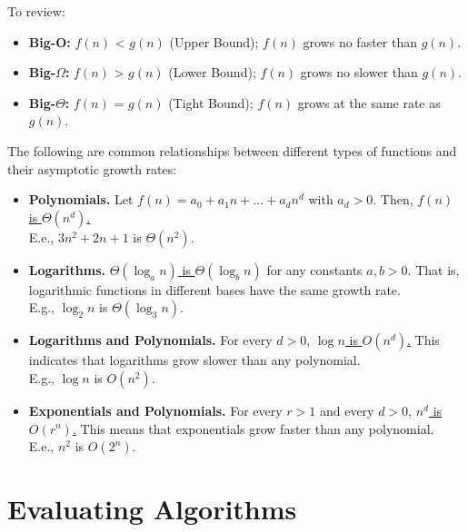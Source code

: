 \begin{Tip}
    To review:
    \begin{itemize}
        \item \textbf{Big-O:} $f(n)$ < $g(n)$ (Upper Bound); $f(n)$ grows no faster than $g(n)$.
        \item \textbf{Big-$\Omega$:} $f(n)$ > $g(n)$ (Lower Bound); $f(n)$ grows no slower than $g(n)$.
        \item \textbf{Big-$\Theta$:} $f(n)$ = $g(n)$ (Tight Bound); $f(n)$ grows at the same rate as $g(n)$.
    \end{itemize}
\end{Tip}

\begin{theo}

    The following are common relationships between different types of functions and their asymptotic growth rates:

    \begin{itemize}
        \item \textbf{Polynomials.} Let $f(n) = a_0 + a_1 n + \dots + a_d n^d$ with $a_d > 0$. Then, \underline{$f(n)$ is $\Theta(n^d)$.}\\
        E.e., $3n^2+2n+1$ is $\Theta(n^2)$.
        
        \item \textbf{Logarithms.} \underline{$\Theta(\log_a n)$ is $\Theta(\log_b n)$} for any constants $a, b > 0$. That is, logarithmic functions in different bases have the same growth rate.\\
        E.g., $\log_2 n$ is $\Theta(\log_3 n)$.
        
        \item \textbf{Logarithms and Polynomials.} For every $d > 0$, \underline{$\log n$ is $O(n^d)$.} This indicates that logarithms grow slower than any polynomial.\\
        E.g., $\log n$ is $O(n^2)$.
        
        \item \textbf{Exponentials and Polynomials.} For every $r > 1$ and every $d > 0$, \underline{$n^d$ is $O(r^n)$.} This means that exponentials grow faster than any polynomial.\\
        E.e., $n^2$ is $O(2^n)$.
    \end{itemize}
\end{theo}

\newpage 
\section{Evaluating Algorithms}

